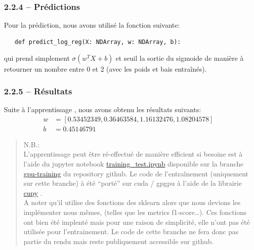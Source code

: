 \documentclass[
]{article}
\begin{document}
\hypertarget{pruxe9dictions}{%
\subsubsection{2.2.4 -- Prédictions}\label{pruxe9dictions}}

Pour la prédiction, nous avons utilisé la fonction suivante:

\begin{lstlisting}
   def predict_log_reg(X: NDArray, w: NDArray, b):
\end{lstlisting}

qui prend simplement \(\sigma(w^T X + b)\) et seuil la sortie du
sigmoide de manière à retourner un nombre entre 0 et 2 (avec les poids
et bais entraînés).

\newpage{}

\hypertarget{ruxe9sultats}{%
\subsubsection{2.2.5 -- Résultats}\label{ruxe9sultats}}

Suite à l'apprentissage , nous avons obtenu les résultats suivants:
\begin{align*}
    w &= [0.53452349, 0.36463584, 1.16132476, 1.08204578]\\
    b &= 0.45146791
\end{align*}

\begin{quote}
N.B.:\\
L'apprentissage peut être ré-effectué de manière efficient si besoine
est à l'aide du jupyter notebook
\href{https://github.com/David-Kyrat/13X005-AI-Project/blob/gpu-training/training_test.ipynb}{training\_test.ipynb}
disponible sur la branche
\href{https://github.com/David-Kyrat/13X005-AI-Project/blob/gpu-training/training_test.ipynb}{gpu-training}
du repository github. Le code de l'entraînement (uniquement sur cette
branche) à été ``porté'' sur cuda / gpgpu à l'aide de la librairie
\href{https://cupy.dev}{cupy} \cite{NumPySciPyGPU}.\\
A noter qu'il utilise des fonctions des sklearn alors que nous devions
les implémenter nous mêmes, (telles que les metrics f1-score\ldots). Ces
fonctions ont bien été implenté mais pour une raison de simplicité, elle
n'ont pas été utilisée pour l'entrainement. Le code de cette branche ne
fera donc pas partie du rendu mais reste publiquement accessible sur
github.
\end{quote}
\end{document}
